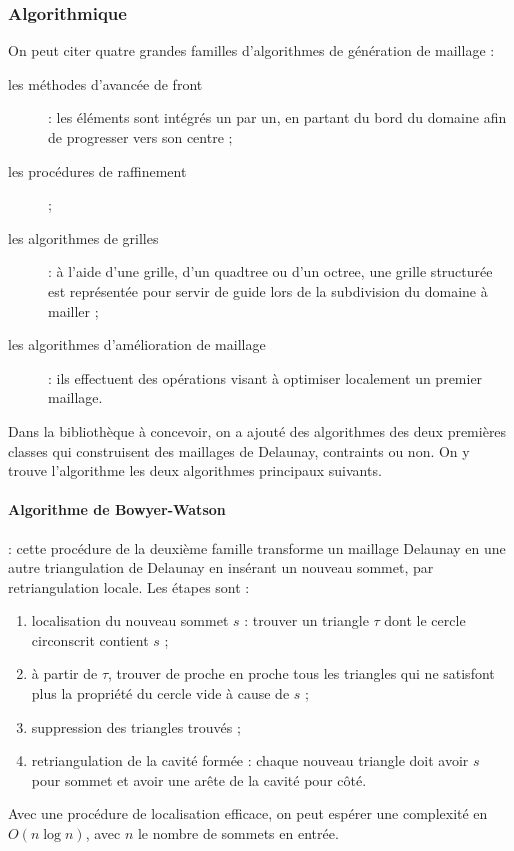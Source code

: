 \documentclass[12pt,a4paper]{report}
\begin{document}
\subsubsection{Algorithmique}

On peut citer quatre grandes familles d'algorithmes de génération de maillage :
\begin{description}
\item[les méthodes d'avancée de front] : les éléments sont intégrés un par un, en partant du bord du domaine afin de progresser vers son centre ;
\item[les procédures de raffinement] ;
\item[les algorithmes de grilles] : à l'aide d'une grille, d'un quadtree ou d'un octree, une grille structurée est représentée pour servir de guide lors de la subdivision du domaine à mailler ;
\item[les algorithmes d'amélioration de maillage] : ils effectuent des opérations visant à optimiser localement un premier maillage.
\end{description}



Dans la bibliothèque à concevoir, on a ajouté des algorithmes des deux premières classes qui construisent des maillages de Delaunay, contraints ou non. On y trouve l'algorithme les deux algorithmes principaux suivants.

\paragraph{Algorithme de Bowyer-Watson} : cette procédure de la deuxième famille transforme un maillage Delaunay en une autre triangulation de Delaunay en insérant un nouveau sommet, par retriangulation locale. Les étapes sont :
\begin{enumerate}
\item localisation du nouveau sommet $s$ : trouver un triangle $\tau$ dont le cercle circonscrit contient $s$ ;
\item à partir de $\tau$, trouver de proche en proche tous les triangles qui ne satisfont plus la propriété du cercle vide à cause de $s$ ;
\item suppression des triangles trouvés ;
\item retriangulation de la cavité formée : chaque nouveau triangle doit avoir $s$ pour sommet et avoir une arête de la cavité pour côté.
\end{enumerate}
Avec une procédure de localisation efficace, on peut espérer une complexité en $O(n\log n)$, avec $n$ le nombre de sommets en entrée.
\end{document}
